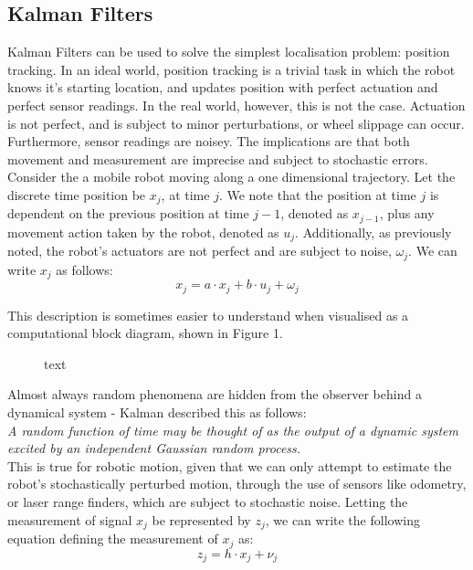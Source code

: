 \documentclass[a4paper]{article}
\begin{document}
\subsection{Kalman Filters}
Kalman Filters can be used to solve the simplest localisation problem: position tracking. In an ideal world, position tracking is a trivial task in which the robot knows it's starting location, and updates position with perfect actuation and perfect sensor readings. In the real world, however, this is not the case. Actuation is not perfect, and is subject to minor perturbations, or wheel slippage can occur. Furthermore, sensor readings are noisey. The implications are that both movement and measurement are imprecise and subject to stochastic errors. Consider the a mobile robot moving along a one dimensional trajectory. Let the discrete time position be $x_j$, at time $j$. We note that the position at time $j$ is dependent on the previous position at time $j-1$, denoted as $x_{j-1}$, plus any movement action taken by the robot, denoted as $u_j$. Additionally, as previously noted, the robot's actuators are not perfect and are subject to noise, $\omega_j$. We can write $x_j$ as follows:
\begin{equation}
x_j = a \cdot x_j + b \cdot u_j + \omega_j
\end{equation}

This description is sometimes easier to understand when visualised as a computational block diagram, shown in Figure 1.
\begin{figure}[h]
\centering

\caption{text}
\end{figure}

Almost always random phenomena are hidden from the observer behind a dynamical system - Kalman described this as follows:\\

\textit{A random function of time may be thought of as the output of a dynamic system excited by an independent Gaussian random process.} \cite{Kalman:1960}\\

This is true for robotic motion, given that we can only attempt to estimate the robot's stochastically perturbed motion, through the use of sensors like odometry, or laser range finders, which are subject to stochastic noise. Letting the measurement of signal $x_j$ be represented by $z_j$, we can write the following equation defining the measurement of $x_j$ as:
\begin{equation}
z_j = h \cdot x_j + \nu_j
\end{equation} 
\end{document}
